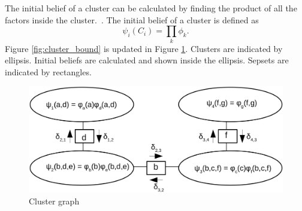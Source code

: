 \documentclass[12pt,oneside,openany,a4paper, %
afrikaans,english,
]{memoir}
\numberwithin{equation}{chapter}
\begin{document}
The initial belief of a cluster can be calculated by finding the product of all the factors inside the cluster.~\citep{koller}. The initial belief of a cluster is defined as
\begin{equation}
\psi_i(C_i) = \prod_{k}\phi_k.
\end{equation}
Figure \ref{fig:cluster_bound} is updated in Figure \ref{fig:clustergraph}. Clusters are indicated by ellipsis. Initial beliefs are calculated and shown inside the ellipsis. Sepsets are indicated by rectangles.
\begin{figure}[H]
  \includegraphics[width=\linewidth]{Figures/clustergraph.png}
  \centering
  \caption{Cluster graph}
  \label{fig:clustergraph}
\end{figure}
\end{document}
